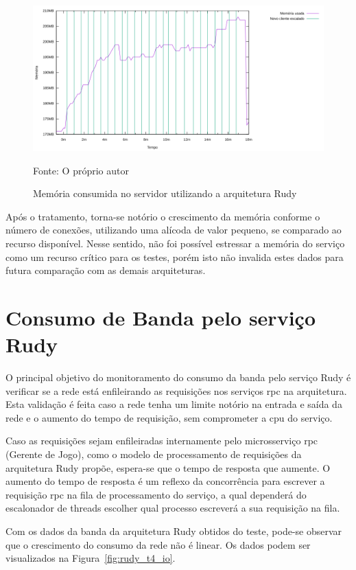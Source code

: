 \begin{figure}[htb!]
    \caption{Memória consumida no servidor utilizando a arquitetura Rudy}
    \label{fig:rudy_t4_memory_used}
    \includegraphics[width=\textwidth]{metricas_rudy_t4/memory_used.png}
    \centering
    
    Fonte: O próprio autor
\end{figure}

Após o tratamento, torna-se notório o crescimento da memória conforme o número de conexões, utilizando uma alícoda de valor pequeno, se comparado ao recurso disponível.
%
Nesse sentido, não foi possível estressar a memória do serviço como um recurso crítico para os testes, porém isto não invalida estes dados para futura comparação com as demais arquiteturas.

\section{Consumo de Banda pelo serviço Rudy}

O principal objetivo do monitoramento do consumo da banda pelo serviço Rudy é verificar se a rede está enfileirando as requisições nos serviços \ac{rpc} na arquitetura.
%
Esta validação é feita caso a rede tenha um limite notório na entrada e saída da rede e o aumento do tempo de requisição, sem comprometer a \ac{cpu} do serviço.

Caso as requisições sejam enfileiradas internamente pelo microsserviço \ac{rpc} (Gerente de Jogo), como o modelo de processamento de requisições da arquitetura Rudy propõe, espera-se que o tempo de resposta que aumente.
%
O aumento do tempo de resposta é um reflexo da concorrência para escrever a requisição \ac{rpc} na fila de processamento do serviço, a qual dependerá do escalonador de threads escolher qual processo escreverá a sua requisição na fila.

Com os dados da banda da arquitetura Rudy obtidos do teste, pode-se observar que o crescimento do consumo da rede não é linear.
%
Os dados podem ser visualizados na Figura~\ref{fig:rudy_t4_io}.

